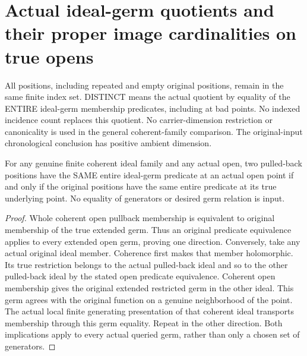\section{Actual ideal-germ quotients and their proper image cardinalities on true opens}

All positions, including repeated and empty original positions, remain in the
same finite index set. DISTINCT means the actual quotient by equality of the
ENTIRE ideal-germ membership predicates, including at bad points. No indexed
incidence count replaces this quotient. No carrier-dimension restriction or
canonicality is used in the general coherent-family comparison.
The original-input chronological conclusion has positive ambient dimension.

\begin{theorem}
\label{hir:sharp-actual-ideal-germ-relation-open}
\leanok
For any genuine finite coherent ideal family and any actual open, two pulled-back
positions have the SAME entire ideal-germ predicate at an actual open point if
and only if the original positions have the same entire predicate at its true
underlying point. No equality of generators or desired germ relation is input.
\end{theorem}
\begin{proof}
Whole coherent open pullback membership is equivalent to original membership
of the true extended germ. Thus an original predicate equivalence applies to
every extended open germ, proving one direction. Conversely, take any actual
original ideal member. Coherence first makes that member holomorphic. Its true
restriction belongs to the actual pulled-back ideal and so to the other
pulled-back ideal by the stated open predicate equivalence. Coherent open
membership gives the original extended restricted germ in the other ideal.
This germ agrees with the original function on a genuine neighborhood of the
point. The actual local finite generating presentation of that coherent ideal
transports membership through this germ equality. Repeat in the other direction.
Both implications apply to every actual queried germ, rather than only a chosen
set of generators.
\end{proof}

